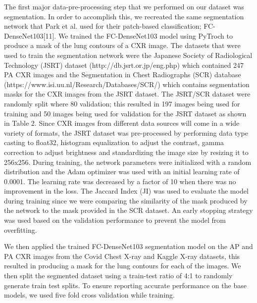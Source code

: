 \documentclass{sigkddExp}
\begin{document}
The first major data-pre-processing step that we performed on our dataset was
segmentation. In order to accomplish this, we recreated the same segmentation
network that Park et al. used for their patch-based classification;
FC-DenseNet103[11]. We trained the FC-DenseNet103 model using PyTroch to produce
a mask of the lung contours of a CXR image. The datasets that were used to train
the segmentation network were the Japanese Society of Radiological Technology
(JSRT) dataset (http://db.jsrt.or.jp/eng.php) which contained 247 PA CXR images
and the Segmentation in Chest Radiographs (SCR) database
(https://www.isi.uu.nl/Research/Databases/SCR/)  which contains segmentation
masks for the CXR images from the JSRT dataset. The JSRT/SCR dataset were
randomly split where 80%
validation; this resulted in 197 images being used for training and 50 images
being used for validation for the JSRT dataset as shown in Table 2. Since CXR
images from different data sources will come in a wide variety of formats, the
JSRT dataset was pre-processed by performing data type casting to float32,
histogram equalization to adjust the contrast, gamma correction to adjust
brightness and standardizing the image size by resizing it to 256x256. During
training, the network parameters were initialized with a random distribution and
the Adam optimizer was used with an initial learning rate of 0.0001. The
learning rate was decreased by a factor of 10 when there was no improvement in
the loss. The Jaccard Index (JI) was used to evaluate the model during training
since we were comparing the similarity of the mask produced by the network to
the mask provided in the SCR dataset. An early stopping strategy was used based
on the validation performance to prevent the model from overfitting.

We then applied the trained FC-DenseNet103 segmentation model on the AP and PA
CXR images from the Covid Chest X-ray and Kaggle X-ray datasets, this resulted
in producing a mask for the lung contours for each of the images. We then split
the segmented dataset using a train-test ratio of 4:1 to randomly generate train
test splits. To ensure reporting accurate performance on the base models, we
used five fold cross validation while training.
\end{document}
